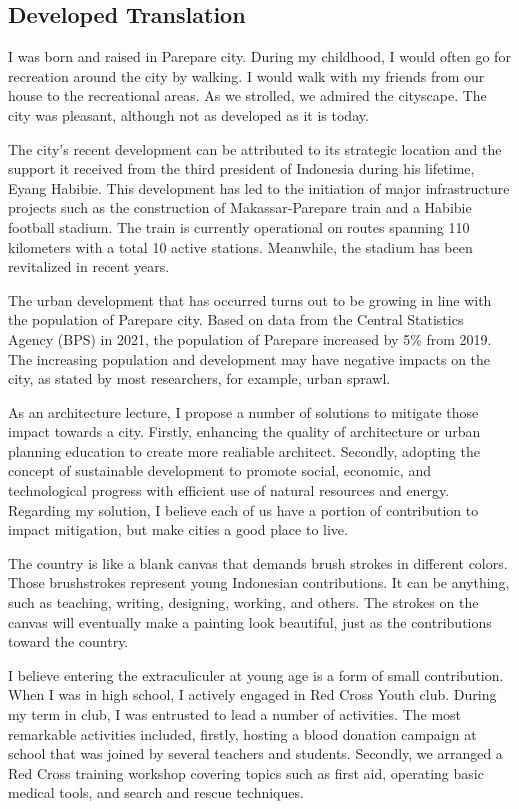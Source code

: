 \documentclass[../main.tex]{subfiles}
\begin{document}
\subsection{Developed Translation}%
\label{sub:Developed Translation}

I was born and raised in Parepare city. During my childhood, I would often go for recreation around the city by walking.
I would walk with my friends from our house to the recreational areas. As we strolled, we admired the cityscape. The city was pleasant, although not as developed as it is today.

The city's recent development can be attributed to its strategic location and the support it received from the third president of Indonesia during his lifetime, Eyang Habibie.
This development has led to the initiation of major infrastructure projects such as the construction of Makassar-Parepare train and a Habibie football stadium.
The train is currently operational on routes spanning 110 kilometers with a total 10 active stations.
Meanwhile, the stadium has been revitalized in recent years.

The urban development that has occurred turns out to be growing in line with the population of Parepare city. Based on data from the Central Statistics Agency (BPS) in 2021, the population of Parepare increased by 5\% from 2019. The increasing population and development may have negative impacts on the city, as stated by most researchers, for example, urban sprawl.

As an architecture lecture, I propose a number of solutions to mitigate those impact towards a city.
Firstly, enhancing the quality of architecture or urban planning education to create more realiable architect. Secondly, adopting the concept of sustainable development to promote social, economic, and technological progress with efficient use of natural resources and energy.
Regarding my solution, I believe each of us have a portion of contribution to impact mitigation, but make cities a good place to live.

The country is like a blank canvas that demands brush strokes in different colors.
Those brushstrokes represent young Indonesian contributions.
It can be anything, such as teaching, writing, designing, working, and others.
The strokes on the canvas will eventually make a painting look beautiful, just as the contributions toward the country.

I believe entering the extraculiculer at young age is a form of small contribution.
When I was in high school, I actively engaged in Red Cross Youth club.
During my term in club, I was entrusted to lead a number of activities.
The most remarkable activities included, firstly, hosting a blood donation campaign at school that was joined by several teachers and students.
Secondly, we arranged a Red Cross training workshop covering topics such as first aid, operating basic medical tools, and search and rescue techniques.
\end{document}
